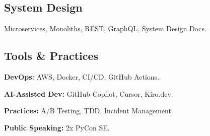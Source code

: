 \documentclass[a4paper]{MagicalCV}
\begin{document}
\begin{minipage}[t]{0.33\textwidth}
\subsection{System Design}
\begin{tightemize}
\item Microservices, Monoliths, REST, GraphQL, System Design Docs.
\end{tightemize}
\sectionsep

\subsection{Tools \& Practices}
\begin{tightemize}
\item {\bf DevOps:} AWS, Docker, CI/CD, GitHub Actions.
\item {\bf AI-Assisted Dev:} GitHub Copilot, Cursor, Kiro.dev.
\item {\bf Practices:} A/B Testing, TDD, Incident Management.
\item {\bf Public Speaking:} 2x PyCon SE.
\end{tightemize}
\sectionsep


\end{minipage}
\hfill
\end{document}
